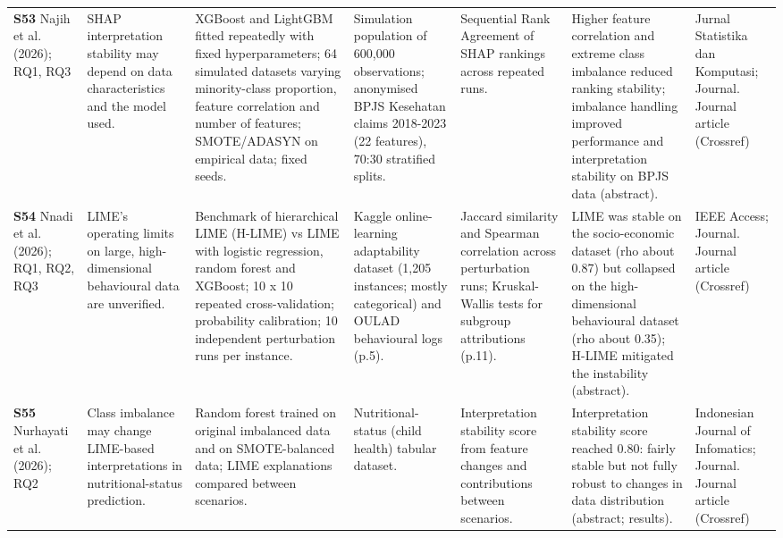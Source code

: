 \begin{longtable}{@{}P{1.55cm}P{2.9cm}P{4.5cm}P{3.2cm}P{3.4cm}P{4.6cm}P{3.6cm}@{}}
\textbf{S53} \cite{S53} Najih et al. (2026); RQ1, RQ3 & SHAP interpretation stability may depend on data characteristics and the model used. & XGBoost and LightGBM fitted repeatedly with fixed hyperparameters; 64 simulated datasets varying minority-class proportion, feature correlation and number of features; SMOTE/\allowbreak{}ADASYN on empirical data; fixed seeds. & Simulation population of 600,000 observations; anonymised BPJS Kesehatan claims 2018-2023 (22 features), 70:30 stratified splits. & Sequential Rank Agreement of SHAP rankings across repeated runs. & Higher feature correlation and extreme class imbalance reduced ranking stability; imbalance handling improved performance and interpretation stability on BPJS data (abstract). & Jurnal Statistika dan Komputasi; Journal. Journal article (Crossref) \\
\textbf{S54} \cite{S54} Nnadi et al. (2026); RQ1, RQ2, RQ3 & LIME's operating limits on large, high-dimensional behavioural data are unverified. & Benchmark of hierarchical LIME (H-LIME) vs LIME with logistic regression, random forest and XGBoost; 10 x 10 repeated cross-validation; probability calibration; 10 independent perturbation runs per instance. & Kaggle online-learning adaptability dataset (1,205 instances; mostly categorical) and OULAD behavioural logs (p.5). & Jaccard similarity and Spearman correlation across perturbation runs; Kruskal-Wallis tests for subgroup attributions (p.11). & LIME was stable on the socio-economic dataset (rho about 0.87) but collapsed on the high-dimensional behavioural dataset (rho about 0.35); H-LIME mitigated the instability (abstract). & IEEE Access; Journal. Journal article (Crossref) \\
\textbf{S55} \cite{S55} Nurhayati et al. (2026); RQ2 & Class imbalance may change LIME-based interpretations in nutritional-status prediction. & Random forest trained on original imbalanced data and on SMOTE-balanced data; LIME explanations compared between scenarios. & Nutritional-status (child health) tabular dataset. & Interpretation stability score from feature changes and contributions between scenarios. & Interpretation stability score reached 0.80: fairly stable but not fully robust to changes in data distribution (abstract; results). & Indonesian Journal of Infomatics; Journal. Journal article (Crossref) \\

\end{longtable}
